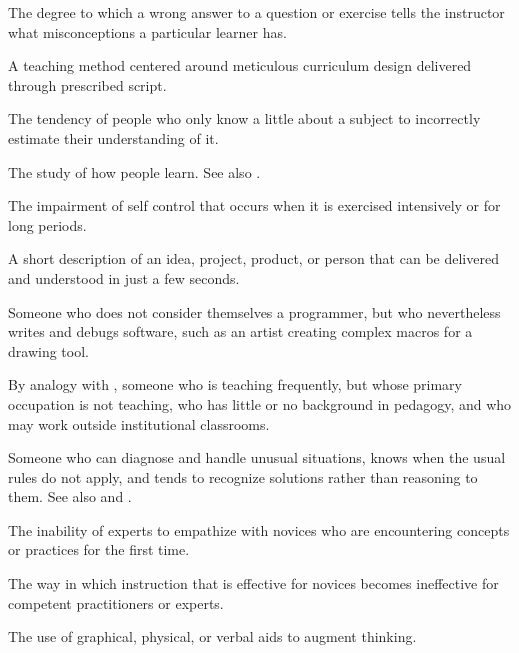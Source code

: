 \begin{description}
 The degree to which a wrong answer
to a question or exercise tells the instructor what misconceptions a particular
learner has.

 A teaching method centered
around meticulous curriculum design delivered through prescribed script.

 The tendency of people
who only know a little about a subject to incorrectly estimate their
understanding of it.

 The study of how
people learn. See also .

 The impairment of self control that
occurs when it is exercised intensively or for long periods.

 A short description of an idea,
project, product, or person that can be delivered and understood in just a few
seconds.

 Someone who does not
consider themselves a programmer, but who nevertheless writes and debugs
software, such as an artist creating complex macros for a drawing tool.

 By analogy with
,
someone who is teaching frequently, but whose primary occupation is not
teaching, who has little or no background in pedagogy, and who may work outside
institutional classrooms.

 Someone who can diagnose and handle unusual
situations, knows when the usual rules do not apply, and tends to recognize
solutions rather than reasoning to them. See
also 
and .

 The inability of experts to
empathize with novices who are encountering concepts or practices for the first
time.

 The way in which
instruction that is effective for novices becomes ineffective for competent
practitioners or experts.

 The use of graphical,
physical, or verbal aids to augment thinking.


\end{description}
